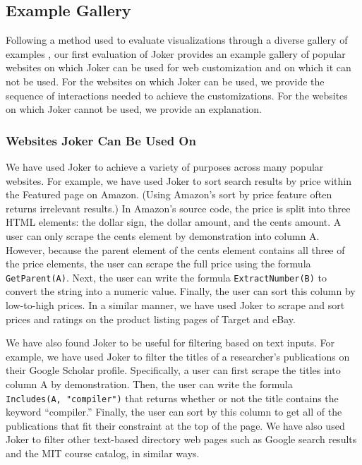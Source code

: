 \documentclass[sigconf,10pt]{acmart}
\begin{document}
\hypertarget{example-gallery}{%
\subsection{Example Gallery}\label{example-gallery}}

Following a method used to evaluate visualizations through a diverse
gallery of examples \citep{ren2018}, our first evaluation of Joker
provides an example gallery of popular websites on which Joker can be
used for web customization and on which it can not be used. For the
websites on which Joker can be used, we provide the sequence of
interactions needed to achieve the customizations. For the websites on
which Joker cannot be used, we provide an explanation.

\hypertarget{websites-joker-can-be-used-on}{%
\subsubsection{Websites Joker Can Be Used
On}\label{websites-joker-can-be-used-on}}

We have used Joker to achieve a variety of purposes across many popular
websites. For example, we have used Joker to sort search results by
price within the Featured page on Amazon. (Using Amazon's sort by price
feature often returns irrelevant results.) In Amazon's source code, the
price is split into three HTML elements: the dollar sign, the dollar
amount, and the cents amount. A user can only scrape the cents element
by demonstration into column A. However, because the parent element of
the cents element contains all three of the price elements, the user can
scrape the full price using the formula \texttt{GetParent(A)}. Next, the
user can write the formula \texttt{ExtractNumber(B)} to convert the
string into a numeric value. Finally, the user can sort this column by
low-to-high prices. In a similar manner, we have used Joker to scrape
and sort prices and ratings on the product listing pages of Target and
eBay.

We have also found Joker to be useful for filtering based on text
inputs. For example, we have used Joker to filter the titles of a
researcher's publications on their Google Scholar profile. Specifically,
a user can first scrape the titles into column A by demonstration. Then,
the user can write the formula \texttt{Includes(A,\ "compiler")} that
returns whether or not the title contains the keyword ``compiler.''
Finally, the user can sort by this column to get all of the publications
that fit their constraint at the top of the page. We have also used
Joker to filter other text-based directory web pages such as Google
search results and the MIT course catalog, in similar ways.
\end{document}
